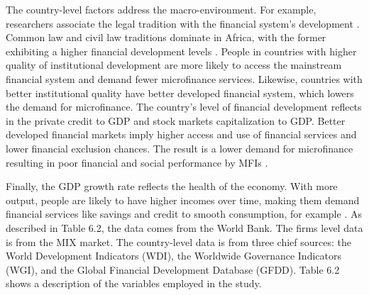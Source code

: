 \documentclass[a4paper, nobind]{templates/ociamthesis}
\begin{document}
The country-level factors address the macro-environment. For example, researchers associate the legal tradition with the financial system's development \autocite{schnyder2018twenty}. Common law and civil law traditions dominate in Africa, with the former exhibiting a higher financial development levels \autocite{la2013law}. People in countries with higher quality of institutional development are more likely to access the mainstream financial system \autocite{allen2013resolving,allen2014african} and demand fewer microfinance services. Likewise, countries with better institutional quality have better developed financial system, which lowers the demand for microfinance. The country's level of financial development reflects in the private credit to GDP and stock markets capitalization to GDP. Better developed financial markets imply higher access and use of financial services and lower financial exclusion chances. The result is a lower demand for microfinance resulting in poor financial and social performance by MFIs \autocite{allen2013resolving,allen2014african}.

Finally, the GDP growth rate reflects the health of the economy. With more output, people are likely to have higher incomes over time, making them demand financial services like savings and credit to smooth consumption, for example \autocite{ahlin2011does,buera2021macroeconomics}. As described in Table 6.2, the data comes from the World Bank. The firms level data is from the MIX market. The country-level data is from three chief sources: the World Development Indicators (WDI), the Worldwide Governance Indicators (WGI), and the Global Financial Development Database (GFDD). Table 6.2 shows a description of the variables employed in the study.
\end{document}
